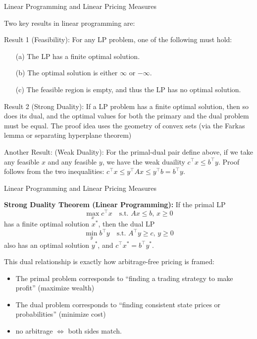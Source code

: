 \documentclass{beamer}
\begin{document}
\begin{frame}{Linear Programming and Linear Pricing Measures}

    {\footnotesize \footnotesize
    Two key results in linear programming are:

\par Result 1 (Feasibility): For any LP problem, one of the following must hold:
\begin{enumerate}
\item[(a)] The LP has a finite optimal solution.
\item[(b)] The optimal solution is either $\infty$ or $-\infty$.
\item[(c)] The feasible region is empty, and thus the LP has no optimal solution.
\end{enumerate}
\vspace{1em}
\vspace{1em}
\par  \pause Result 2 (Strong Duality):
If a LP problem has a finite optimal solution, then so does its dual,
 and the optimal values for both the primary and the dual problem must be equal.
 The proof idea uses the geometry of convex sets (via the Farkas lemma or separating hyperplane theorem)
 \vspace{1em}
\par \pause Another Result: (Weak Duality): For the primal-dual pair define above, if we take any feasible $x$
and any feasible $y$, we have the weak duaility $c^\top x\leq b^\top y$. Proof follows from the two inequalities:
$ c^\top x\leq y^\top Ax \leq y^\top b = b^\top y$.

    }
\end{frame}

\begin{frame}{Linear Programming and Linear Pricing Measures}

    {\footnotesize \footnotesize
    \par \textbf{Strong Duality Theorem (Linear Programming):}
    If the primal LP
    \[
    \max_{x} c^{\top} x \quad \text{s.t. } Ax \leq b, \, x \geq 0
    \]
    has a finite optimal solution $x^*$, then the dual LP
    \[
    \min_{y} b^{\top} y \quad \text{s.t. } A^{\top} y \geq c, \, y \geq 0
    \]
    also has an optimal solution $y^*$, and $ c^{\top} x^* = b^{\top} y^*.$
    \vspace{1em}
    \par  \pause This dual relationship is exactly how arbitrage-free pricing is framed:
    \begin{itemize}
        \item  The primal problem corresponds to ``finding a trading strategy to make profit'' (maximize wealth)
        \item  The dual problem corresponds to ``finding consistent state prices or probabilities'' (minimize cost)
        \item  no arbitrage $\Leftrightarrow$ both sides match.
    \end{itemize}
    }
\end{frame}
\end{document}
